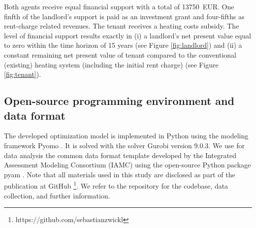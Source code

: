 Both agents receive equal financial support with a total of \SI{13750}{EUR}. One finfth of the landlord's support is paid as an investment grant and four-fifths as rent-charge related revenues. The tenant receives a heating costs subsidy. The level of financial support results exactly in (i) a landlord's net present value equal to zero within the time horizon of 15 years (see Figure \ref{fig:landlord}) and (ii) a constant remaining net present value of tenant compared to the conventional (existing) heating system (including the initial rent charge) (see Figure \ref{fig:tenant}). 

\subsection{Open-source programming environment and data format}\label{met:os}
The developed optimization model is implemented in Python using the modeling framework Pyomo \cite{hart2017optimization}. It is solved with the solver Gurobi version 9.0.3. We use for data analysis the common data format template developed by the Integrated Assessment Modeling Consortium (IAMC) using the open-source Python package pyam \cite{huppmann2021pyam}. Note that all materials used in this study are disclosed as part of the publication at GitHub \footnote{https://github.com/sebastianzwickl}. We refer to the repository for the codebase, data collection, and further information. 